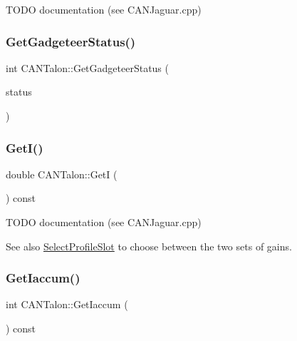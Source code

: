 T\+O\+DO documentation (see C\+A\+N\+Jaguar.\+cpp) \mbox{\label{class_c_a_n_talon_a228bf58fd2926e5d9596ffde3b1fad8f}} 
\subsubsection{\texorpdfstring{Get\+Gadgeteer\+Status()}{GetGadgeteerStatus()}}
{\footnotesize\ttfamily int C\+A\+N\+Talon\+::\+Get\+Gadgeteer\+Status (\begin{DoxyParamCaption}\item[{I\+Gadgeteer\+Uart\+Client\+::\+Gadgeteer\+Uart\+Status \&}]{status }\end{DoxyParamCaption})}

\mbox{\label{class_c_a_n_talon_a29c00b36b915c21c5ae10c3cf64ce244}} 
\subsubsection{\texorpdfstring{Get\+I()}{GetI()}}
{\footnotesize\ttfamily double C\+A\+N\+Talon\+::\+GetI (\begin{DoxyParamCaption}{ }\end{DoxyParamCaption}) const\hspace{0.3cm}{\ttfamily [override]}}

T\+O\+DO documentation (see C\+A\+N\+Jaguar.\+cpp) \begin{DoxySeeAlso}{See also}
\hyperlink{class_c_a_n_talon_a0f478462884ed5e541179821c44b724f}{Select\+Profile\+Slot} to choose between the two sets of gains. 
\end{DoxySeeAlso}
\mbox{\label{class_c_a_n_talon_ad675d77fe044d57525b02b3b01219557}} 
\subsubsection{\texorpdfstring{Get\+Iaccum()}{GetIaccum()}}
{\footnotesize\ttfamily int C\+A\+N\+Talon\+::\+Get\+Iaccum (\begin{DoxyParamCaption}{ }\end{DoxyParamCaption}) const}

